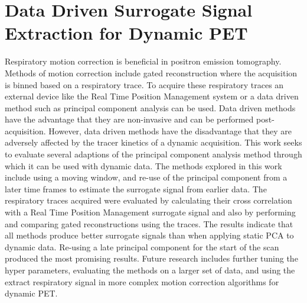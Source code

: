 \chapter{Data Driven Surrogate Signal Extraction for Dynamic PET} \label{sec:data_driven_surrogate_signal_extraction_results}
            
    
        Respiratory motion correction is beneficial in positron emission tomography. Methods of motion correction include gated reconstruction where the acquisition is binned based on a respiratory trace. To acquire these respiratory traces an external device like the Real Time Position Management system or a data driven method such as principal component analysis can be used. Data driven methods have the advantage that they are non-invasive and can be performed post-acquisition. However, data driven methods have the disadvantage that they are adversely affected by the tracer kinetics of a dynamic acquisition. This work seeks to evaluate several adaptions of the principal component analysis method through which it  can be used with dynamic data. The methods explored in this work include using a moving window, and re-use of the principal component from a later time frames to estimate the surrogate signal from earlier data. The respiratory traces acquired were evaluated by calculating their cross correlation with a Real Time Position Management surrogate signal and also by performing and comparing gated reconstructions using the traces. The results indicate that all methods produce better surrogate signals than when applying static PCA to dynamic data. Re-using a late principal component for the start of the scan produced the most promising results. Future research includes further tuning the hyper parameters, evaluating the methods on a larger set of data, and using the extract respiratory signal in more complex motion correction algorithms for dynamic PET.
        
